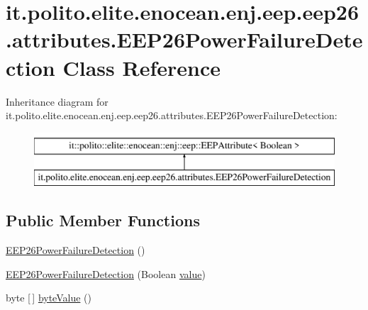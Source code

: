 \hypertarget{classit_1_1polito_1_1elite_1_1enocean_1_1enj_1_1eep_1_1eep26_1_1attributes_1_1_e_e_p26_power_failure_detection}{}\section{it.\+polito.\+elite.\+enocean.\+enj.\+eep.\+eep26.\+attributes.\+E\+E\+P26\+Power\+Failure\+Detection Class Reference}
\label{classit_1_1polito_1_1elite_1_1enocean_1_1enj_1_1eep_1_1eep26_1_1attributes_1_1_e_e_p26_power_failure_detection}
Inheritance diagram for it.\+polito.\+elite.\+enocean.\+enj.\+eep.\+eep26.\+attributes.\+E\+E\+P26\+Power\+Failure\+Detection\+:\begin{figure}[H]
\begin{center}
\leavevmode
\includegraphics[height=2.000000cm]{classit_1_1polito_1_1elite_1_1enocean_1_1enj_1_1eep_1_1eep26_1_1attributes_1_1_e_e_p26_power_failure_detection}
\end{center}
\end{figure}
\subsection*{Public Member Functions}
\begin{DoxyCompactItemize}
\item 
\hyperlink{classit_1_1polito_1_1elite_1_1enocean_1_1enj_1_1eep_1_1eep26_1_1attributes_1_1_e_e_p26_power_failure_detection_aaa81a7d4644f23a9990ae9786241e1fa}{E\+E\+P26\+Power\+Failure\+Detection} ()
\item 
\hyperlink{classit_1_1polito_1_1elite_1_1enocean_1_1enj_1_1eep_1_1eep26_1_1attributes_1_1_e_e_p26_power_failure_detection_a0ae5d9ae2f7e8906b604e8f4c82f1dc8}{E\+E\+P26\+Power\+Failure\+Detection} (Boolean \hyperlink{classit_1_1polito_1_1elite_1_1enocean_1_1enj_1_1eep_1_1_e_e_p_attribute_af4d7e34642004bb6ccfae51e925c983d}{value})
\item 
byte \mbox{[}$\,$\mbox{]} \hyperlink{classit_1_1polito_1_1elite_1_1enocean_1_1enj_1_1eep_1_1eep26_1_1attributes_1_1_e_e_p26_power_failure_detection_ae9eb26fbe393e3aa5086212dea6eae3e}{byte\+Value} ()
\end{DoxyCompactItemize}
